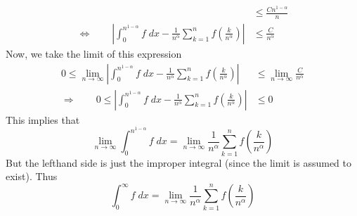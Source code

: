 \documentclass[12pt]{article}
\theoremstyle{plain}
\theoremstyle{definition}
\theoremstyle{remark}
\begin{document}
\begin{enumerate}
\begin{align*}
        &\leq \frac{C{n^{1-\alpha}}}{n}  \\
    \Leftrightarrow \qquad 
     \left\lvert \int^{n^{1-\alpha}}_0 f \; dx -  
        \frac{1}{n^\alpha} \sum^n_{k=1} f\left(\frac{k}{n^\alpha} \right) 
        \right\rvert
        &\leq \frac{C}{n^\alpha}  
\end{align*}
Now, we take the limit of this expression
\begin{align*}
     0\leq \lim_{n\rightarrow\infty} \left\lvert \int^{n^{1-\alpha}}_0 f \; dx -  
        \frac{1}{n^\alpha} \sum^n_{k=1} f\left(\frac{k}{n^\alpha} \right) 
        \right\rvert
        &\leq \lim_{n\rightarrow\infty} \frac{C}{n^\alpha}  \\
     \Rightarrow \qquad 
        0\leq \left\lvert \int^{n^{1-\alpha}}_0 f \; dx -  
        \frac{1}{n^\alpha} \sum^n_{k=1} f\left(\frac{k}{n^\alpha} \right) 
        \right\rvert
        &\leq 0  
\end{align*}
This implies that 
\begin{equation}
        \lim_{n\rightarrow\infty} \int^{n^{1-\alpha}}_0 f \; dx =  
        \lim_{n\rightarrow\infty} \frac{1}{n^\alpha} \sum^n_{k=1} f\left(\frac{k}{n^\alpha} \right) 
\end{equation}
But the lefthand side is just the improper integral (since the limit is assumed to exist). Thus
\begin{equation}
        \int^{\infty}_0 f \; dx =  
        \lim_{n\rightarrow\infty} \frac{1}{n^\alpha} \sum^n_{k=1} f\left(\frac{k}{n^\alpha} \right) 
\end{equation}


    






\end{enumerate}
\end{document}
